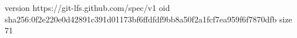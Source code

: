version https://git-lfs.github.com/spec/v1
oid sha256:0f2e220e0d42891c391d01173bf6ffdfdf9bb8a50f2a1fcf7ea959f6f7870dfb
size 71
